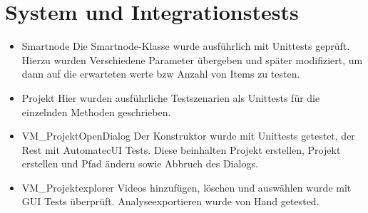 \chapter{System und Integrationstests}
\begin{itemize}
\item Smartnode \newline
Die Smartnode-Klasse wurde ausführlich mit Unittests geprüft. Hierzu wurden Verschiedene Parameter übergeben und später modifiziert, um dann auf die erwarteten werte bzw Anzahl von Items zu testen.
\item Projekt \newline
Hier wurden ausführliche Testszenarien als Unittests für die einzelnden Methoden geschrieben.
\item VM_ProjektOpenDialog \newline
Der Konstruktor wurde mit Unittests getestet, der Rest mit AutomatecUI Tests. Diese beinhalten Projekt erstellen, Projekt erstellen und Pfad ändern sowie Abbruch des Dialogs.
\item VM_Projektexplorer \newline
Videos hinzufügen, löschen und auswählen wurde mit GUI Tests überprüft. Analyseexportieren wurde von Hand getested.
\end{itemize}